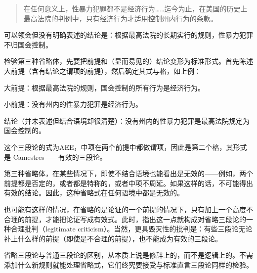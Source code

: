 \begin{quote}
在任何意义上，性暴力犯罪都不是经济行为……迄今为止，在美国的历史上最高法院的判例中，只有经济行为才适用控制州内行为的条款。\cite{usc2000}
\end{quote}

可以领会但没有明确表述的结论是：根据最高法院的长期实行的规则，性暴力犯罪不归国会控制。

检验第三种省略体，先要把前提和（显而易见的）结论变形为标准形式。首先陈述大前提（含有结论之谓项的前提），然后确定其式与格，如上例：

大前提：根据最高法院的规则，国会控制的所有行为是经济行为。

小前提：没有州内的性暴力犯罪是经济行为。

结论（并未表述但结合语境却很清楚）：没有州内的性暴力犯罪是最高法院规定为国会控制的。

这个三段论的式为AEE，中项在两个前提中都做谓项，因此是第二个格，其形式是 Camestres——有效的三段论。

第三种省略体，在某些情况下，即使不结合语境也能看出是无效的——例如，两个前提都是否定的，或者都是特称的，或者中项不周延。如果这样的话，不可能得出有效的结论。因此，这种省略式在任何语境中都是无效的。

也可能有这样的情况，在省略的是论证的一个前提的情况下，只有加上一个高度不合理的前提，才能把论证写成有效式。此时，指出这一点就构成对省略三段论的一种合理批判（legitimate criticism）。当然，更具毁灭性的批判是：有些三段论无论补上什么样的前提（即使是不合理的前提），也不能成为有效的三段论。

省略三段论与普通三段论的区别，从本质上说是修辞上的，而不是逻辑上的。不需添加什么新规则就能处理省略式，它们终究要接受与标准直言三段论同样的检验。


